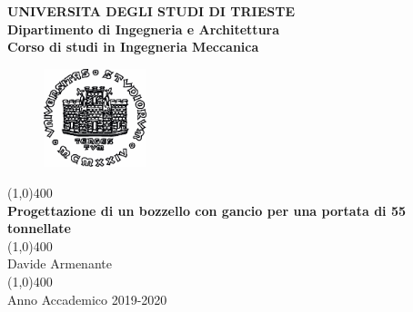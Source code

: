 \documentclass[11pt]{article}
\begin{document}
\begin{titlepage}

\begin{center}
\vspace{1cm}
\large{\textbf{UNIVERSITA DEGLI STUDI DI TRIESTE}}\\[3mm]
\large{\textbf{Dipartimento di Ingegneria e Architettura}}\\[.7mm]
\large{\textbf{Corso di studi in Ingegneria Meccanica}}\\

\begin{figure}
\centering
  \includegraphics[width=3cm]{imgs/unilogo.jpg}
\end{figure}

\vfill
\line(1,0){400}\\
\huge{\textbf{Progettazione di un bozzello con gancio per una portata di 55 tonnellate}}\\
\line(1,0){400}\\
\vfill
\hfill \normalsize Davide Armenante\\
\line(1,0){400}\\
Anno Accademico 2019-2020

\end{center}
\end{titlepage}
\pagebreak
\tableofcontents 
\thispagestyle{empty}
\pagebreak
\setcounter{page}{1}


\pagebreak

\pagebreak

\pagebreak

\pagebreak

\pagebreak


\appendix
\end{document}
